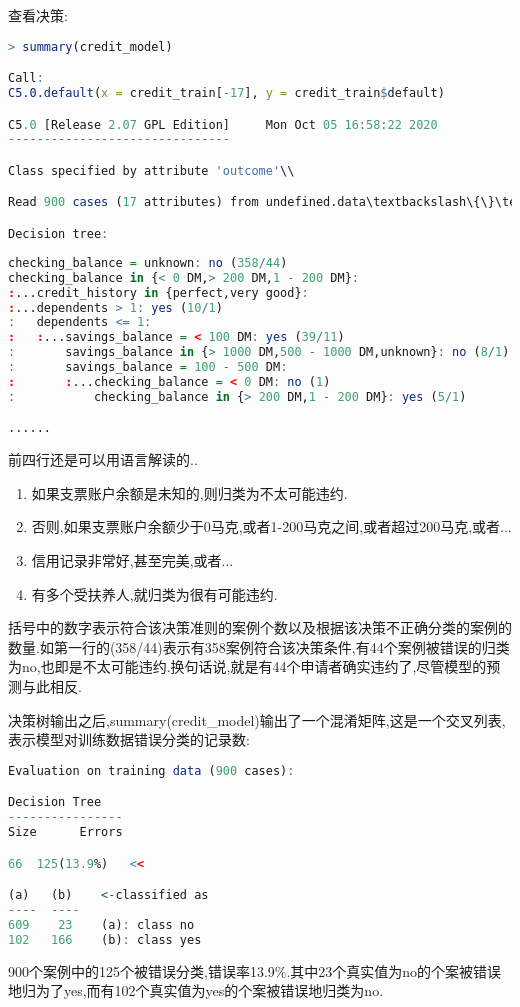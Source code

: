 \documentclass[11pt,a4paper,oneside]{book}
\begin{document}
查看决策:
\begin{lstlisting}[language=r]
> summary(credit_model)

Call:
C5.0.default(x = credit_train[-17], y = credit_train$default)

C5.0 [Release 2.07 GPL Edition]  	Mon Oct 05 16:58:22 2020
-------------------------------

Class specified by attribute 'outcome'\\

Read 900 cases (17 attributes) from undefined.data\textbackslash\{\}\textbackslash\{\}

Decision tree:

\end{lstlisting}
\begin{lstlisting}[language=r]
checking_balance = unknown: no (358/44)
checking_balance in {< 0 DM,> 200 DM,1 - 200 DM}:
:...credit_history in {perfect,very good}:
:...dependents > 1: yes (10/1)
:   dependents <= 1:
:   :...savings_balance = < 100 DM: yes (39/11)
:       savings_balance in {> 1000 DM,500 - 1000 DM,unknown}: no (8/1)
:       savings_balance = 100 - 500 DM:
:       :...checking_balance = < 0 DM: no (1)
:           checking_balance in {> 200 DM,1 - 200 DM}: yes (5/1)

......
\end{lstlisting}
前四行还是可以用语言解读的..
\begin{enumerate}
	\item 如果支票账户余额是未知的,则归类为不太可能违约.
	\item 否则,如果支票账户余额少于0马克,或者1-200马克之间,或者超过200马克,或者...
	\item 信用记录非常好,甚至完美,或者...
	\item 有多个受扶养人,就归类为很有可能违约.
\end{enumerate}

括号中的数字表示符合该决策准则的案例个数以及根据该决策不正确分类的案例的数量.如第一行的(358/44)表示有358案例符合该决策条件,有44个案例被错误的归类为no,也即是不太可能违约.换句话说,就是有44个申请者确实违约了,尽管模型的预测与此相反.

决策树输出之后,summary(credit\_model)输出了一个混淆矩阵,这是一个交叉列表,表示模型对训练数据错误分类的记录数:
\begin{lstlisting}[language=r]
Evaluation on training data (900 cases):

Decision Tree   
----------------  
Size      Errors  

66  125(13.9%)   <<

(a)   (b)    <-classified as
----  ----
609    23    (a): class no
102   166    (b): class yes
\end{lstlisting}
900个案例中的125个被错误分类,错误率13.9\%.其中23个真实值为no的个案被错误地归为了yes,而有102个真实值为yes的个案被错误地归类为no.
\end{document}
